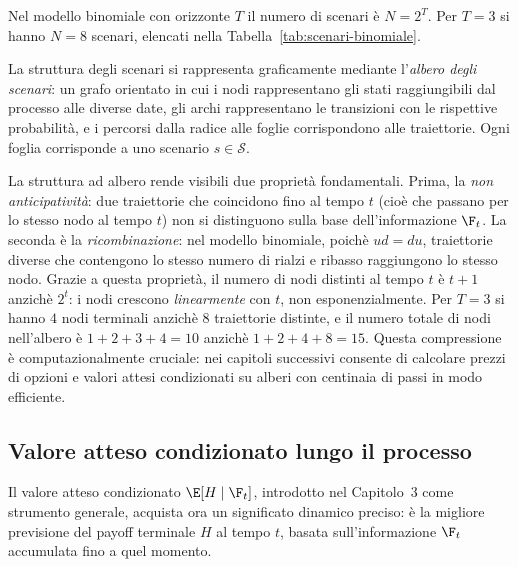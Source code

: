 Nel modello binomiale con orizzonte $T$ il numero di scenari \`{e}
$N=2^T$. Per $T=3$ si hanno $N=8$ scenari, elencati nella
Tabella~\ref{tab:scenari-binomiale}.

La struttura degli scenari si rappresenta graficamente mediante
l'\emph{albero degli scenari}: un grafo orientato in cui i nodi
rappresentano gli stati raggiungibili dal processo alle diverse date,
gli archi rappresentano le transizioni con le rispettive probabilit\`{a},
e i percorsi dalla radice alle foglie corrispondono alle traiettorie.
Ogni foglia corrisponde a uno scenario $s\in\mathcal{S}$.

La struttura ad albero rende visibili due propriet\`{a} fondamentali.
Prima, la \emph{non anticipativit\`{a}}: due traiettorie che
coincidono fino al tempo $t$ (cio\`{e} che passano per lo stesso nodo
al tempo $t$) non si distinguono sulla base dell'informazione
$\F_t$. 
La seconda \`{e} la \emph{ricombinazione}: nel modello binomiale,
poich\`{e} $ud=du$, traiettorie diverse che contengono lo stesso numero
di rialzi e ribasso raggiungono lo stesso nodo. Grazie a questa
propriet\`{a}, il numero di nodi distinti al tempo $t$ \`{e} $t+1$
anzich\`{e} $2^t$: i nodi crescono \emph{linearmente} con $t$, non
esponenzialmente. Per $T=3$ si hanno $4$ nodi terminali anzich\`{e}
$8$ traiettorie distinte, e il numero totale di nodi nell'albero \`{e}
$1+2+3+4=10$ anzich\`{e} $1+2+4+8=15$. Questa compressione \`{e}
computazionalmente cruciale: nei capitoli successivi consente di
calcolare prezzi di opzioni e valori attesi condizionati su alberi
con centinaia di passi in modo efficiente.

\subsection{Valore atteso condizionato lungo il processo}

Il valore atteso condizionato $\E[H\mid\F_t]$, introdotto nel
Capitolo~3 come strumento generale, acquista ora un significato
dinamico preciso: \`{e} la migliore previsione del payoff terminale
$H$ al tempo $t$, basata sull'informazione $\F_t$ accumulata fino
a quel momento.

